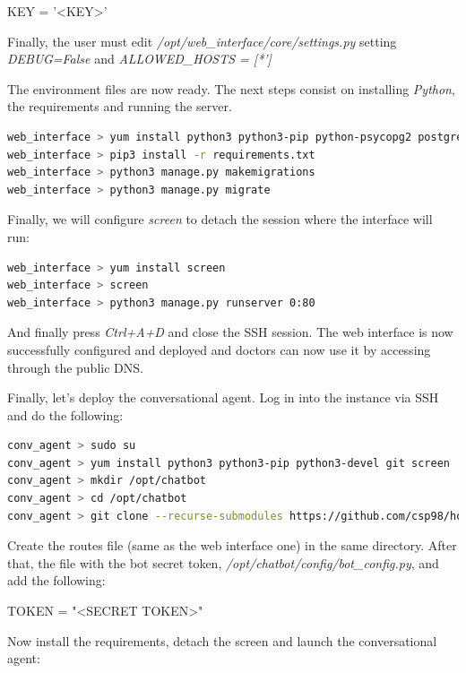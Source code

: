 \documentclass[12pt,english]{article}
\begin{document}
\begin{python}[caption={Django key file contents}, captionpos=b]
  KEY = '<KEY>'
\end{python}

Finally, the user must edit \emph{/opt/web\_interface/core/settings.py} setting \emph{DEBUG=False} and \emph{ALLOWED\_HOSTS = [*']}

The environment files are now ready. The next steps consist on installing \emph{Python}, the requirements and running the server.

\begin{lstlisting}[mathescape=false, language=bash]
web_interface > yum install python3 python3-pip python-psycopg2 postgresql gcc python3-devel
web_interface > pip3 install -r requirements.txt
web_interface > python3 manage.py makemigrations
web_interface > python3 manage.py migrate
\end{lstlisting}

Finally, we will configure \emph{screen} to detach the session where the interface will run:

\begin{lstlisting}[mathescape=false, language=bash]
web_interface > yum install screen
web_interface > screen
web_interface > python3 manage.py runserver 0:80
\end{lstlisting}

And finally press \emph{Ctrl+A+D} and close the SSH session. The web interface is now successfully configured and deployed and doctors can now use it by accessing through the public DNS.

Finally, let's deploy the conversational agent. Log in into the instance via SSH and do the following:

\begin{lstlisting}[mathescape=false, language=bash]
conv_agent > sudo su
conv_agent > yum install python3 python3-pip python3-devel git screen
conv_agent > mkdir /opt/chatbot
conv_agent > cd /opt/chatbot
conv_agent > git clone --recurse-submodules https://github.com/csp98/howru_chatbot.git .
\end{lstlisting}

Create the routes file (same as the web interface one) in the same directory. After that, the file with the bot secret token, \emph{/opt/chatbot/config/bot\_config.py}, and add the following:
\begin{python}
TOKEN = "<SECRET TOKEN>"
\end{python}

Now install the requirements, detach the screen and launch the conversational agent:
\end{document}
